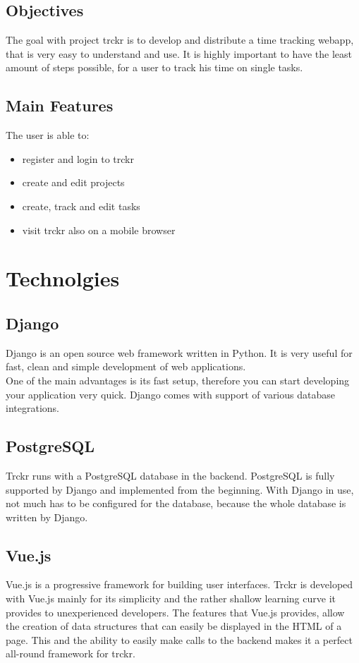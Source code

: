 \documentclass[a4paper, 12pt, headsepline]{scrartcl}
\begin{document}
\subsection{Objectives}
The goal with project trckr is to develop and distribute a time tracking webapp, that is very easy to understand and use. It is highly important to
have the least amount of steps possible, for a user to track his time on single tasks.

\subsection{Main Features}
The user is able to:
\begin{itemize}
    \item register and login to trckr
    \item create and edit projects
    \item create, track and edit tasks
    \item visit trckr also on a mobile browser
\end{itemize}


\section{Technolgies}


\subsection{Django}
Django is an open source web framework written in Python. It is very useful for fast, clean and simple development of web applications.\\
One of the main advantages is its fast setup, therefore you can start developing your application very quick.
Django comes with support of various database integrations.

\subsection{PostgreSQL}
Trckr runs with a PostgreSQL database in the backend. PostgreSQL is fully supported by Django and
implemented from the beginning. With Django in use, not much has to be configured for the database, because
the whole database is written by Django.

\subsection{Vue.js}
Vue.js is a progressive framework for building user interfaces.\cite{vuejs} Trckr is developed with Vue.js mainly for its simplicity and the rather shallow learning curve it provides to unexperienced developers.
The features that Vue.js provides, allow the creation of data structures that can easily be displayed in the HTML of a page. This and the ability to easily make calls to the backend makes it a perfect all-round framework for trckr.
\end{document}
